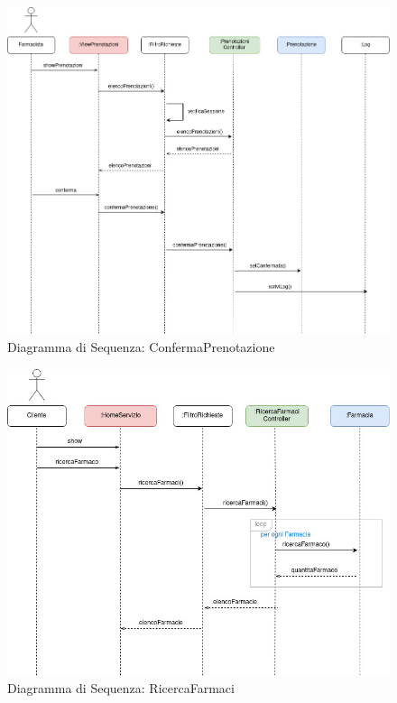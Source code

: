 \newpage

\begin{figure}[h!]
    \begin{center}
        \includegraphics[width=\textwidth]{immagini/Interazione-ConfermaPrenotazione-progettaz.jpg}
        \caption{Diagramma di Sequenza: ConfermaPrenotazione}
    \end{center}
\end{figure}

\newpage

\begin{figure}[h!]
    \begin{center}
        \includegraphics[width=\textwidth]{immagini/Interazione-RicercaFarmaco-progettaz.jpg}
        \caption{Diagramma di Sequenza: RicercaFarmaci}
    \end{center}
\end{figure}

\newpage